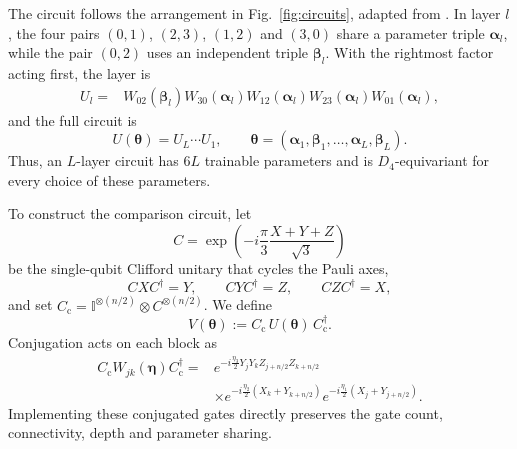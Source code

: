 \documentclass[aps,pra,reprint,superscriptaddress,longbibliography]{revtex4-2}
\begin{document}
The circuit follows the arrangement in Fig.~\ref{fig:circuits},
adapted from \citet{chang2023equivariant}.
In layer $l$, the four pairs
$(0,1)$, $(2,3)$, $(1,2)$ and $(3,0)$ share a parameter triple
$\boldsymbol\alpha_l$, while the pair $(0,2)$ uses an
independent triple $\boldsymbol\beta_l$.
With the rightmost factor acting first, the layer is
\begin{equation}
\begin{aligned}
U_l
={}&W_{02}(\boldsymbol\beta_l)
W_{30}(\boldsymbol\alpha_l)
W_{12}(\boldsymbol\alpha_l)
 W_{23}(\boldsymbol\alpha_l)
W_{01}(\boldsymbol\alpha_l),
\end{aligned}
\label{eq:circuit_layer}
\end{equation}
and the full circuit is
\begin{equation}
U(\boldsymbol\theta)=U_L\cdots U_1,
\qquad
\boldsymbol\theta=
(\boldsymbol\alpha_1,\boldsymbol\beta_1,\ldots,
 \boldsymbol\alpha_L,\boldsymbol\beta_L).
\label{eq:full_equivariant_circuit}
\end{equation}
Thus, an $L$-layer circuit has $6L$ trainable parameters and
is $D_4$-equivariant for every choice of these parameters.

To construct the comparison circuit, let 
\begin{equation}
    C=\exp\left({-i\frac{\pi}{3}\frac{X+Y+Z}{\sqrt{3}}}\right)
\end{equation}
be the
single-qubit Clifford unitary that cycles the Pauli axes,
\begin{equation}
    CXC^\dagger=Y,\qquad
CYC^\dagger=Z,\qquad
CZC^\dagger=X,
\end{equation}
and set $C_{\mathrm c}=\mathbb I^{\otimes(n/2)}\otimes C^{\otimes(n/2)}$.
We define
\begin{equation}
V(\boldsymbol\theta)
:=C_{\mathrm c}\,U(\boldsymbol\theta)\,C_{\mathrm c}^\dagger.
\label{eq:conjugate_circuits}
\end{equation}
Conjugation acts on each block as
\begin{equation}
\begin{aligned}
C_{\mathrm c}W_{jk}(\boldsymbol\eta)C_{\mathrm c}^\dagger
={}&e^{-i\frac{\eta_3}{2}
Y_{j}Y_{k}Z_{j+n/2}Z_{k+n/2}}
\\
&\times e^{-i\frac{\eta_2}{2}(X_{k}+Y_{k+n/2})}
e^{-i\frac{\eta_1}{2}(X_{j}+Y_{j+n/2})}.
\end{aligned}
\label{eq:nonequiv_block}
\end{equation}
Implementing these conjugated gates directly preserves the
gate count, connectivity, depth and parameter sharing.
\end{document}
